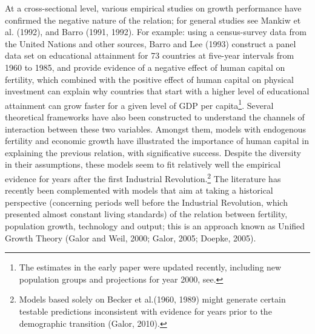 \documentclass[12pt]{article}%
\begin{document}
At a cross-sectional level, various empirical studies on growth performance have confirmed the negative nature of the relation; for general studies see Mankiw et al. (1992), and Barro (1991, 1992). For example: using a census-survey data from the United Nations and other sources, Barro and Lee (1993) construct a panel data set on educational attainment for 73 countries at five-year intervals from 1960 to 1985, and provide evidence of a negative effect of human capital on fertility, which combined with the positive effect of human capital on physical investment can explain why countries that start with a higher level of educational attainment can grow faster for a given level of GDP per capita\footnote{The estimates in the early paper were updated recently, including new population groups and projections for year 2000, see\cite{barro4}. }. Several theoretical frameworks have also been constructed to understand the channels of interaction between these two variables. Amongst them, models with endogenous fertility and economic growth have illustrated the importance of human capital in explaining the previous relation, with significative success. Despite the diversity in their assumptions, these models seem to fit relatively well the empirical evidence for years after the first Industrial Revolution.\footnote{Models based solely on Becker et al.(1960, 1989) might generate certain testable predictions inconsistent with evidence for years prior to the demographic transition (Galor, 2010).} The literature has recently been complemented with models that aim at taking a historical perspective (concerning periods well before the Industrial Revolution, which presented almost constant living standards) of the relation between fertility, population growth, technology and output; this is an approach known as Unified Growth Theory (Galor and Weil, 2000; Galor, 2005; Doepke, 2005).
\end{document}
